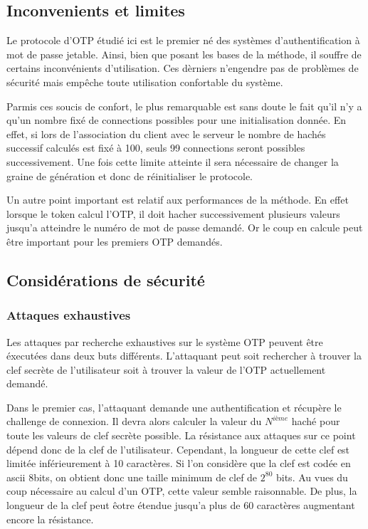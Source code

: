 \documentclass{../res/univ-projet}
\begin{document}
  \subsection{Inconvenients et limites}
  Le protocole d'OTP étudié ici est le premier né des systèmes 
  d'authentification à mot de passe jetable. Ainsi, bien que posant les bases
  de la méthode, il souffre de certains inconvénients d'utilisation. Ces 
  dèrniers n'engendre pas de problèmes de sécurité mais empêche toute 
  utilisation confortable du système.
  
  Parmis ces soucis de confort, le plus remarquable est sans doute le fait
  qu'il n'y a qu'un nombre fixé de connections possibles pour une 
  initialisation donnée. En effet, si lors de l'association du client avec 
  le serveur le nombre de hachés successif calculés est fixé à 100, seuls 
  99 connections seront possibles successivement. Une fois cette limite 
  atteinte il sera nécessaire de changer la graine de génération et donc
  de réinitialiser le protocole.
  
  Un autre point important est relatif aux performances de la méthode. En effet
  lorsque le token calcul l'OTP, il doit hacher successivement plusieurs 
  valeurs jusqu'a atteindre le numéro de mot de passe demandé. Or le coup en 
  calcule peut être important pour les premiers OTP demandés.
  
  \subsection{Considérations de sécurité}
    \subsubsection{Attaques exhaustives}
    Les attaques par recherche exhaustives sur le système OTP peuvent être 
    éxecutées dans deux buts différents. L'attaquant peut soit rechercher à
    trouver la clef secrète de l'utilisateur soit à trouver la valeur de l'OTP
    actuellement demandé.
    
    Dans le premier cas, l'attaquant demande une authentification et récupère 
    le challenge de connexion. Il devra alors calculer la valeur du $N^{ième}$ 
    haché pour toute les valeurs de clef secrète possible. La résistance aux
    attaques sur ce point dépend donc de la clef de l'utilisateur. Cependant, 
    la longueur de cette clef est limitée inférieurement à 10 caractères. Si
    l'on considère que la clef est codée en ascii 8bits, on obtient donc une 
    taille minimum de clef de $2^{80}$ bits. Au vues du coup nécessaire au 
    calcul d'un OTP, cette valeur semble raisonnable. De plus, la longueur de 
    la clef peut êotre étendue jusqu'a plus de 60 caractères augmentant encore
    la résistance.
    
\end{document}
